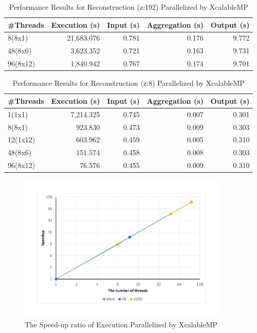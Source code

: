 \documentclass[graybox,vecphys]{svmult}
\begin{document}
\begin{table}[t]
  \begin{center}
  \caption{Performance Results for Reconstruction (z:192) Parallelized by XcalableMP}\label{tab:xmp_z192}
  \begin{tabular}{l|r|rrr}\hline\hline
    \#Threads & Execution (s)    & Input (s) & Aggregation (s) & Output (s)\\\hline\hline
    8(8x1)   &  21,683.076 & 0.781  &  0.176 &  9.772 \\
    48(8x6)  &   3,623.352 & 0.721  &  0.163 &  9.731 \\
    96(8x12) &   1,840.942 & 0.767  &  0.174 &  9.701 \\
    \hline
  \end{tabular}
  \end{center}
\end{table}

\begin{table}[t]
  \begin{center}
  \caption{Performance Results for Reconstruction (z:8) Parallelized by XcalableMP}\label{tab:xmp_z8}
  \begin{tabular}{l|r|rrr}\hline\hline
    \#Threads & Execution (s)    & Input (s) & Aggregation (s) & Output (s)\\\hline\hline
    1(1x1)   &  7,214.325 & 0.745  & 0.007  & 0.301 \\
    8(8x1)   &    923.830 & 0.473  & 0.009  & 0.303 \\
    12(1x12) &    603.962 & 0.459  & 0.005  & 0.310 \\
    48(8x6)  &    151.574 & 0.458  & 0.008  & 0.303 \\
    96(8x12) &     76.576 & 0.455  & 0.009  & 0.310 \\
    \hline
  \end{tabular}
  \end{center}
\end{table}

\begin{figure}[t]
  \begin{center}
  \includegraphics[width=10cm]{xmp96.pdf}
  \caption{The Speed-up ratio of Execution Parallelized by XcalableMP}\label{fig:xmp96}
  \end{center}
\end{figure}
\end{document}
